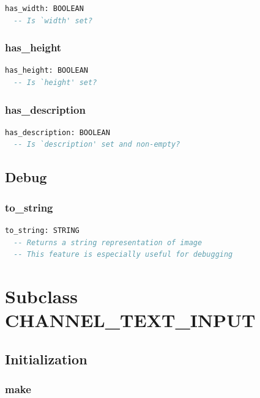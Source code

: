 \begin{lstlisting}[language=Eiffel]
has_width: BOOLEAN
  -- Is `width' set?
\end{lstlisting}

\subsubsection{has\_height}

\begin{lstlisting}[language=Eiffel]
has_height: BOOLEAN
  -- Is `height' set?
\end{lstlisting}

\subsubsection{has\_description}

\begin{lstlisting}[language=Eiffel]
has_description: BOOLEAN
  -- Is `description' set and non-empty?
\end{lstlisting}

\subsection{Debug}
\label{sec:channel-image-debug}

\subsubsection{to\_string}

\begin{lstlisting}[language=Eiffel]
to_string: STRING
  -- Returns a string representation of image
  -- This feature is especially useful for debugging
\end{lstlisting}

\section{Subclass CHANNEL\_TEXT\_INPUT}
\label{sec:channel-text-input}

\subsection{Initialization}
\label{sec:channel-text-input-initialization}

\subsubsection{make}

